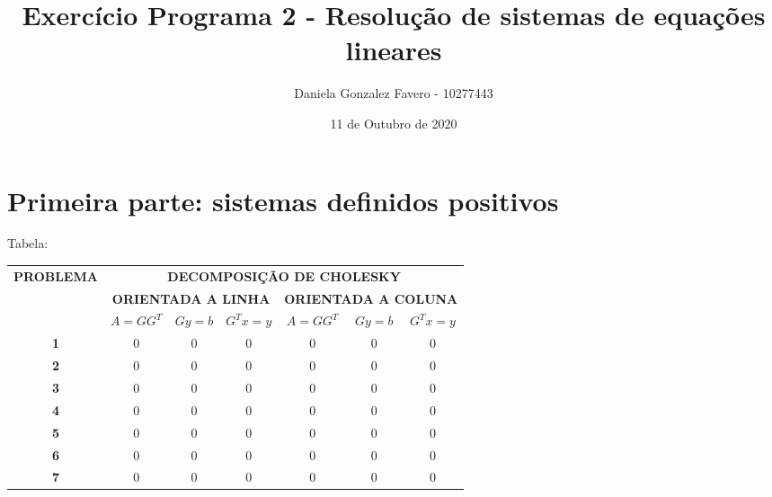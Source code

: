 \documentclass[a4paper,11pt]{article}
\title{Exercício Programa 2 - Resolução de sistemas de equações lineares}
\author{
  Daniela Gonzalez Favero - 10277443
}
\date{11 de Outubro de 2020}
\begin{document}
\maketitle


\section{Primeira parte:  sistemas definidos positivos}

Tabela:

\begin{table}[h]
\begin{tabular}{|c|c|c|c|c|c|c|}
\hline
\multirow{3}{*}{\textbf{PROBLEMA}} & \multicolumn{6}{c|}{\textbf{DECOMPOSIÇÃO DE CHOLESKY}}                                             \\ \cline{2-7} 
                                   & \multicolumn{3}{c|}{\textbf{ORIENTADA A LINHA}} & \multicolumn{3}{c|}{\textbf{ORIENTADA A COLUNA}} \\ \cline{2-7} 
                                   & \textbf{$A=GG^T$}      & \textbf{$Gy=b$}      & \textbf{$G^Tx=y$}     & \textbf{$A=GG^T$}      & \textbf{$Gy=b$}      & \textbf{$G^Tx=y$}      \\ \hline
\textbf{1}                         &  0              &  0              &  0             &  0              &   0             &      0          \\ \hline
\textbf{2}                         &   0             &     0           &  0             &    0            &     0           &       0         \\ \hline
\textbf{3}                         &           0     &         0       &        0       &       0         &       0         &       0         \\ \hline
\textbf{4}                         &         0       &        0        &      0         &        0        &       0         &      0          \\ \hline
\textbf{5}                         &        0        &      0          &        0       &         0       &        0        &      0          \\ \hline
\textbf{6}                         &         0       &       0         &         0      &     0           &       0         &      0          \\ \hline
\textbf{7}                         &         0       &         0       &         0      &      0          &         0       &       0         \\ \hline
\end{tabular}
\end{table}
\end{document}

